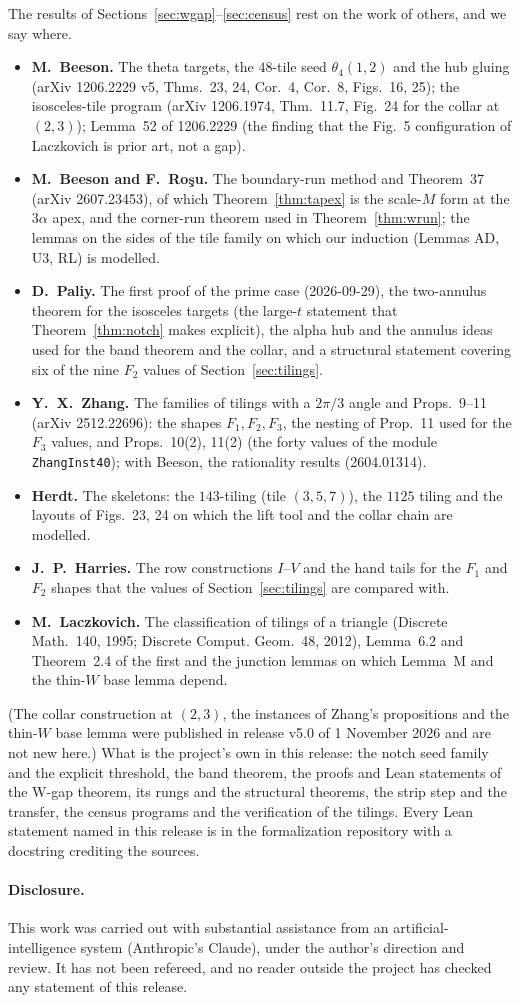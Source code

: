 \documentclass[11pt,reqno]{amsart}
\theoremstyle{plain}
\theoremstyle{definition}
\begin{document}
The results of Sections~\ref{sec:wgap}--\ref{sec:census} rest on the work of others, and we say where.
\begin{itemize}
\item \textbf{M.~Beeson.} The theta targets, the $48$-tile seed $\theta_4(1,2)$ and the hub gluing (arXiv 1206.2229 v5, Thms.~23, 24,
Cor.~4, Cor.~8, Figs.~16, 25); the isosceles-tile program (arXiv 1206.1974, Thm.~11.7, Fig.~24 for the collar at
$(2,3)$); Lemma~52 of 1206.2229 (the finding that the Fig.~5 configuration of Laczkovich is prior art, not a gap).
\item \textbf{M.~Beeson and F.~Ro\c{s}u.} The boundary-run method and Theorem~37 (arXiv 2607.23453), of which
Theorem~\ref{thm:tapex} is the scale-$M$ form at the $3\alpha$ apex, and the corner-run theorem used in
Theorem~\ref{thm:wrun}; the lemmas on the sides of the tile family on which our induction (Lemmas AD, U3, RL) is modelled.
\item \textbf{D.~Paliy.} The first proof of the prime case (2026-09-29), the two-annulus theorem for the isosceles
targets (the large-$t$ statement that Theorem~\ref{thm:notch} makes explicit), the alpha hub and the annulus ideas used for the
band theorem and the collar, and a structural statement covering six of the nine $F_2$ values of Section~\ref{sec:tilings}.
\item \textbf{Y.~X.~Zhang.} The families of tilings with a $2\pi/3$ angle and Props.~9--11 (arXiv 2512.22696): the shapes
$F_1,F_2,F_3$, the nesting of Prop.~11 used for the $F_3$ values, and Props.~10(2), 11(2) (the forty values of the
module \texttt{ZhangInst40}); with Beeson, the rationality results (2604.01314).
\item \textbf{Herdt.} The skeletons: the $143$-tiling (tile $(3,5,7)$), the $1125$ tiling and the layouts of Figs.~23, 24 on which
the lift tool and the collar chain are modelled.
\item \textbf{J.~P.~Harries.} The row constructions $I$--$V$ and the hand tails for the $F_1$ and $F_2$ shapes that
the values of Section~\ref{sec:tilings} are compared with.
\item \textbf{M.~Laczkovich.} The classification of tilings of a triangle (Discrete Math.~140, 1995; Discrete Comput.
Geom.~48, 2012), Lemma~6.2 and Theorem~2.4 of the first and the junction lemmas on which Lemma~M and the thin-$W$
base lemma depend.
\end{itemize}
(The collar construction at $(2,3)$, the instances of Zhang's propositions and the thin-$W$ base lemma were published in
release v5.0 of 1 November 2026 and are not new here.) What is the project's own in this release: the notch seed family and the explicit threshold, the band theorem, the
proofs and Lean statements of the W-gap theorem, its rungs and the structural theorems, the strip step and the
transfer, the census programs and the verification of the tilings. Every Lean statement named in this release is
in the formalization repository with a docstring crediting the sources.

\paragraph{Disclosure.} This work was carried out with substantial assistance from an artificial-intelligence system
(Anthropic's Claude), under the author's direction and review. It has not been refereed, and no reader outside the
project has checked any statement of this release.
\end{document}
